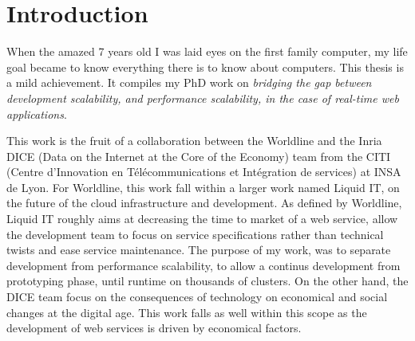 \chapter{Introduction} \label{chapter:conclusion}



When the amazed 7 years old I was laid eyes on the first family computer, my life goal became to know everything there is to know about computers.
This thesis is a mild achievement.
It compiles my PhD work on
\textit{bridging the gap between development scalability, and performance scalability, in the case of real-time web applications}.





This work is the fruit of a collaboration between the Worldline and the Inria DICE (Data on the Internet at the Core of the Economy) team from the CITI (Centre d’Innovation en Télécommunications et Intégration
de services) at INSA de Lyon.
For Worldline, this work fall within a larger work named Liquid IT, on the future of the cloud infrastructure and development.
As defined by Worldline, Liquid IT roughly aims at decreasing the time to market of a web service, allow the development team to focus on service specifications rather than technical twists and ease service maintenance.
The purpose of my work, was to separate development from performance scalability, to allow a continus development from prototyping phase, until runtime on thousands of clusters.
On the other hand, the DICE team focus on the consequences of technology on economical and social changes at the digital age.
This work falls as well within this scope as the development of web services is driven by economical factors.

